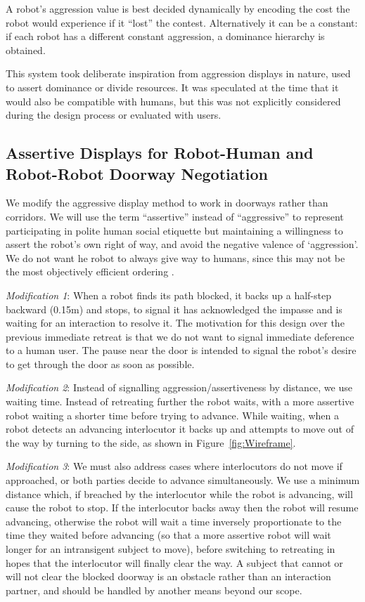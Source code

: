 \documentclass[letterpaper, 10 pt, conference]{ieeeconf}  %
\begin{document}
A robot's aggression value is best decided dynamically by encoding the cost the robot would experience if it ``lost'' the contest. Alternatively it can be a constant: if each robot has a different constant aggression, a dominance hierarchy is obtained.
 
This system took deliberate inspiration from aggression displays in nature, used to assert dominance or divide resources. It was speculated at the time that it would also be compatible with humans, but this was not explicitly considered during the design process or evaluated with users. 


\subsection{Assertive Displays for Robot-Human and Robot-Robot Doorway Negotiation}

We modify the aggressive display method to work in doorways rather than corridors. We will use the term ``assertive'' instead of ``aggressive'' to  represent participating in polite human social etiquette but maintaining a willingness to assert the robot’s own right of way, and avoid the negative valence of `aggression'. We do not want he robot to always give way to humans, since this may not be the most objectively efficient ordering \cite{zuluaga2005reducing}.


\textit{Modification 1}:  When a robot finds its path blocked, it backs up a half-step backward (0.15m) and stops, to signal it has acknowledged the impasse and is waiting for an interaction to resolve it. The motivation for this design over the previous immediate retreat is that we do not want to signal immediate deference to a human user. The pause near the door is intended to signal the robot's desire to get through the door as soon as possible.

\textit{Modification 2}: Instead of signalling aggression/assertiveness by distance, we use waiting time. Instead of retreating further the robot waits, with a more assertive robot waiting a shorter time before trying to advance. While waiting, when a robot detects an advancing interlocutor it backs up and attempts to move out of the way by turning to the side, as shown in Figure~\ref{fig:Wireframe}.


\textit{Modification 3}: We must also address cases where interlocutors do not move if approached, or both parties decide to advance simultaneously. We use a minimum distance which, if breached by the interlocutor while the robot is advancing, will cause the robot to stop. If the interlocutor backs away then the robot will resume advancing, otherwise the robot will wait a time inversely proportionate to the time they waited before advancing (so that a more assertive robot will wait longer for an intransigent subject to move), before switching to retreating in hopes that the interlocutor will finally clear the way. A subject that cannot or will not clear the blocked doorway is an obstacle rather than an interaction partner, and should be handled by another means beyond our scope. 
 
\end{document}
